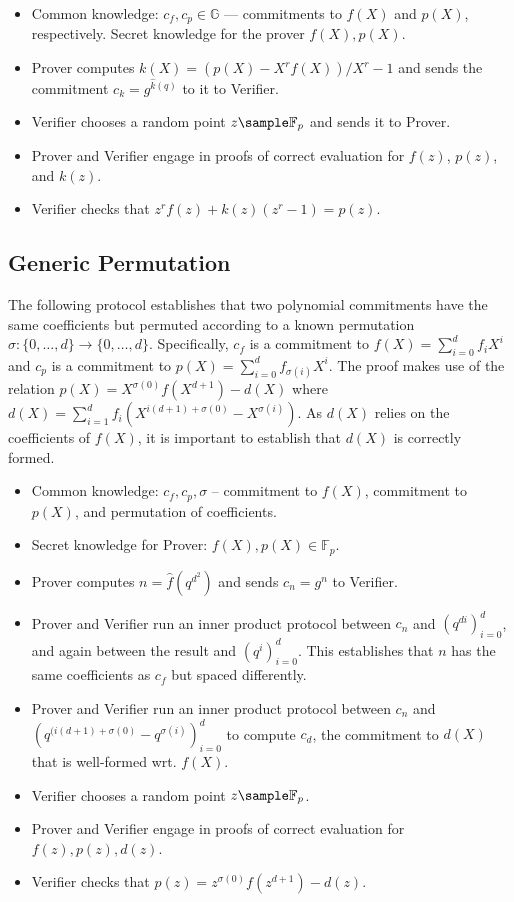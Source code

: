 \begin{itemize}
    \item Common knowledge: $c_f, c_p \in \mathbb{G}$ --- commitments to $f(X)$ and $p(X)$, respectively. Secret knowledge for the prover $f(X), p(X)$.
    \item Prover computes $k(X) = (p(X) - X^r f(X)) / X^r - 1$ and sends the commitment $c_k = g^{\hat{k}(q)}$ to it to Verifier.
    \item Verifier chooses a random point $z \sample \mathbb{F}_p$ and sends it to Prover.
    \item Prover and Verifier engage in proofs of correct evaluation for $f(z)$, $p(z)$, and $k(z)$.
    \item Verifier checks that $z^r f(z) + k(z) (z^r-1) = p(z)$.
\end{itemize}

\subsection{Generic Permutation}

The following protocol establishes that two polynomial commitments have the same coefficients but permuted according to a known permutation $\sigma : \{0,\ldots,d\} \rightarrow \{0,\ldots,d\}$. Specifically, $c_f$ is a commitment to $f(X) = \sum_{i=0}^d f_i X^i$ and $c_p$ is a commitment to $p(X) = \sum_{i=0}^d f_{\sigma(i)} X^i$. The proof makes use of the relation $p(X) = X^{\sigma(0)} f(X^{d+1}) - d(X)$ where $d(X) = \sum_{i=1}^d f_i (X^{i(d+1) + \sigma(0)} - X^{\sigma(i)})$. As $d(X)$ relies on the coefficients of $f(X)$, it is important to establish that $d(X)$ is correctly formed.

\begin{itemize}
    \item Common knowledge: $c_f, c_p, \sigma$ -- commitment to $f(X)$, commitment to $p(X)$, and permutation of coefficients.
    \item Secret knowledge for Prover: $f(X), p(X) \in \mathbb{F}_p$.
    \item Prover computes $n = \hat{f}(q^{d^2})$ and sends $c_n = g^n$ to Verifier.
    \item Prover and Verifier run an inner product protocol between $c_n$ and $(q^{di})_{i=0}^d$, and again between the result and $(q^i)_{i=0}^d$. This establishes that $n$ has the same coefficients as $c_f$ but spaced differently.
    \item Prover and Verifier run an inner product protocol between $c_n$ and $(q^{(i(d+1) + \sigma(0)} - q^{\sigma(i)})_{i=0}^d$ to compute $c_d$, the commitment to $d(X)$ that is well-formed wrt. $f(X)$.
    \item Verifier chooses a random point $z \sample \mathbb{F}_p$.
    \item Prover and Verifier engage in proofs of correct evaluation for $f(z), p(z), d(z)$.
    \item Verifier checks that $p(z) = z^{\sigma(0)} f(z^{d+1}) - d(z)$.
\end{itemize}


